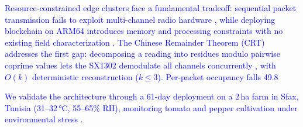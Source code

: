 \documentclass[pdflatex,sn-mathphys-num]{sn-jnl}
\theoremstyle{thmstyleone}
\theoremstyle{thmstyletwo}
\theoremstyle{thmstylethree}
\begin{document}
\textcolor{blue}{Resource-constrained edge clusters face a fundamental tradeoff: sequential packet transmission fails to exploit multi-channel radio hardware \cite{rathi2025smart, wang2025lora, chen2025compression, marcelloni2009energy}, while deploying blockchain on ARM64 introduces memory and processing constraints with no existing field characterization \cite{tar2023fabric, jayaram2023hyperledger, dube2024fabricIrrigation}. The Chinese Remainder Theorem (CRT) addresses the first gap: decomposing a reading into residues modulo pairwise coprime values lets the SX1302 demodulate all channels concurrently \cite{garner1959residue, ding1996remainder}, with $O(k)$ deterministic reconstruction ($k \leq 3$). Per-packet occupancy falls 49.8%

\textcolor{blue}{We validate the architecture through a 61‑day deployment on a 2\,ha farm in Sfax, Tunisia (31–32\,°C, 55–65\% RH), monitoring tomato and pepper cultivation under environmental stress \cite{mohammed2025loraEnergy, raza2018lorawan, brooks2019precisionWater, williams2022savings, miller2020climateImpact}.}

}
\end{document}
